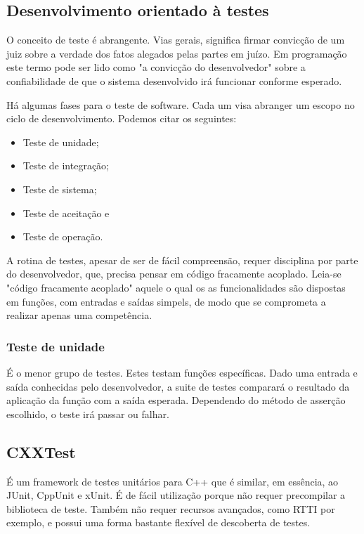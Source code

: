 \documentclass[
	article,			%
	12pt,				%
	oneside,			%
	a4paper,			%
	english,			
	brazil,
	sumario=tradicional
	]{abntex2}
\begin{document}
\pagebreak
\subsection{Desenvolvimento orientado à testes}

O conceito de teste é abrangente. Vias gerais, significa firmar convicção de um juiz sobre a verdade dos fatos alegados pelas partes em juízo. Em programação este termo pode ser lido como "a convicção do desenvolvedor" sobre a confiabilidade de que o sistema desenvolvido irá funcionar conforme esperado.

Há algumas fases para o teste de software. Cada um visa abranger um escopo no ciclo de desenvolvimento. Podemos citar os seguintes:
\begin{itemize}
	\item Teste de unidade;
	\item Teste de integração;
	\item Teste de sistema;
	\item Teste de aceitação e
	\item Teste de operação.
\end{itemize}

A rotina de testes, apesar de ser de fácil compreensão, requer disciplina por parte do desenvolvedor, que, precisa pensar em código fracamente acoplado. Leia-se "código fracamente acoplado" aquele o qual os as funcionalidades são dispostas em funções, com entradas e saídas simpels, de modo que se comprometa a realizar apenas uma competência.

\subsubsection{Teste de unidade}

É o menor grupo de testes. Estes testam funções específicas. Dado uma entrada e saída conhecidas pelo desenvolvedor, a suite de testes comparará o resultado da aplicação da função com a saída esperada. Dependendo do método de asserção escolhido, o teste irá passar ou falhar.

\pagebreak
\subsection{CXXTest}

É um framework de testes unitários para C++ que é similar, em essência, ao JUnit, CppUnit e xUnit. É de fácil utilização porque não requer precompilar a biblioteca de teste. Também não requer recursos avançados, como RTTI por exemplo, e possui uma forma bastante flexível de descoberta de testes.
\end{document}
